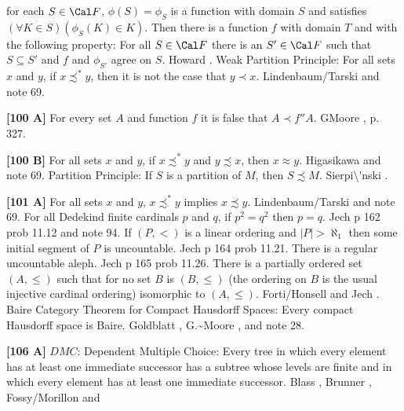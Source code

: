 for each $S\in{\Cal F}$, $\phi(S) = \phi_{S}$ is a function with domain
$S$ and satisfies $(\forall K\in S)(\phi_{S}(K)\in K)$.  Then there is
a function $f$ with domain $T$ and with the following property:  For all
$S\in{\Cal F}$ there is an $S'\in{\Cal F}$ such that $S\subseteq S'$ and
$f$ and $\phi_{S'}$ agree on $S$.  \ac{Howard} \cite{1993}.
\medskip
{} Weak Partition Principle:  For all sets
$x$ and $y$, if $x\precsim^* y$, then it is not the case that
$y\prec x$.  \ac{Lindenbaum/Tarski} \cite{1926} and note 69.
\smallskip
\item{}{\bf [100 A]} For every set $A$ and function $f$ it is false that
$A \prec f''A$. G\. \ac{Moore} \cite{1982}, p. 327.
\smallskip
\item{}{\bf [100 B]} For all sets $x$ and $y$, if $x\precsim^* y$ and
$y\precsim x$, then $x\approx y$. \ac{Higasikawa} \cite{1995} and note 69.
\medskip
{}  Partition Principle:  If $S$ is a partition of
$M$, then $S \precsim M$.  \ac{Sierpi\'nski} \cite{1947}.
\smallskip
\item{}{\bf [101 A]}  For all sets $x$ and $y$, $x \precsim^* y$ implies
$x\precsim y$.  \ac{Lindenbaum/Tarski} \cite{1926} and note 69.
\medskip
{}  For all Dedekind finite cardinals $p$ and $q$, if
$p^{2} = q^{2}$ then $p = q$. \ac{Jech} \cite{1973b} p 162 prob 11.12 and
note 94.
\medskip
{}  If $(P,<)$ is a linear ordering and
$|P| > \aleph_{1}$ then some initial segment of $P$ is uncountable.
\ac{Jech} \cite{1973b} p 164 prob 11.21.
\medskip
{} There is a regular uncountable aleph. \ac{Jech}
\cite{1966b} p 165 prob 11.26.
\medskip
{} There is a  partially ordered set $(A,\le)$ such
that for no set $B$ is $(B,\le)$ (the ordering  on $B$ is the usual
injective cardinal ordering) isomorphic to $(A,\le)$. \ac{Forti/Honsell}
\cite{1985} and \ac{Jech} \cite{1966c}.
\medskip
{} Baire Category Theorem for Compact Hausdorff
Spaces: Every compact Hausdorff space is Baire.
\ac{Goldblatt} \cite{1985}, \ac{G.~Moore} \cite{1982}, and note 28.
\smallskip
\item{}{\bf [106 A]} $DMC$: Dependent Multiple Choice:  Every tree
in which every element has at least one immediate successor
has a subtree whose levels are finite and in which every element
has at least one immediate successor.  \ac{Blass} \cite{1979},
\ac{Brunner} \cite{1983c}, \ac{Fossy/Morillon} \cite{1998} and
